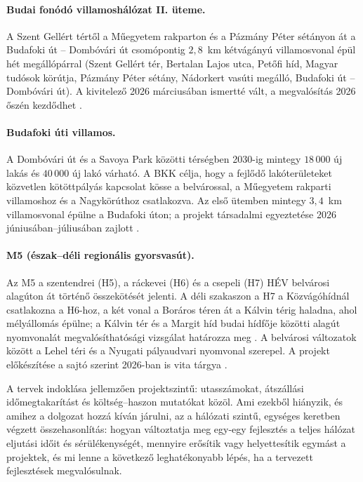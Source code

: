 \documentclass[12pt,a4paper]{article}
\theoremstyle{definition}
\theoremstyle{remark}
\begin{document}
\paragraph{Budai fonódó villamoshálózat II. üteme.}
A Szent Gellért tértől a Műegyetem rakparton és a Pázmány Péter sétányon át
a Budafoki út -- Dombóvári út csomópontig $2{,}8$~km kétvágányú villamosvonal
épül hét megállópárral (Szent Gellért tér, Bertalan Lajos utca, Petőfi híd,
Magyar tudósok körútja, Pázmány Péter sétány, Nádorkert vasúti megálló,
Budafoki út -- Dombóvári út). A kivitelező 2026 márciusában ismertté vált, a
megvalósítás 2026 őszén kezdődhet \citep{bkk2026bf2, beruhazas2026}.

\paragraph{Budafoki úti villamos.}
A Dombóvári út és a Savoya Park közötti térségben 2030-ig mintegy $18\,000$ új
lakás és $40\,000$ új lakó várható. A BKK célja, hogy a fejlődő
lakóterületeket közvetlen kötöttpályás kapcsolat kösse a belvárossal, a
Műegyetem rakparti villamoshoz és a Nagykörúthoz csatlakozva. Az első
ütemben mintegy $3{,}4$~km villamosvonal épülne a Budafoki úton; a projekt
társadalmi egyeztetése 2026 júniusában--júliusában zajlott
\citep{bkk2026budafoki}.

\paragraph{M5 (észak--déli regionális gyorsvasút).}
Az M5 a szentendrei (H5), a ráckevei (H6) és a csepeli (H7) HÉV belvárosi
alagúton át történő összekötését jelenti. A déli szakaszon a H7 a
Közvágóhídnál csatlakozna a H6-hoz, a két vonal a Boráros téren át a Kálvin
térig haladna, ahol mélyállomás épülne; a Kálvin tér és a Margit híd budai
hídfője közötti alagút nyomvonalát megvalósíthatósági vizsgálat határozza meg
\citep{bavs2021, metropol2022}. A belvárosi változatok között a Lehel téri
és a Nyugati pályaudvari nyomvonal szerepel. A projekt előkészítése a
sajtó szerint 2026-ban is vita tárgya \citep{economx2026}.

A tervek indoklása jellemzően projektszintű: utasszámokat, átszállási
időmegtakarítást és költség--haszon mutatókat közöl. Ami ezekből hiányzik, és
amihez a dolgozat hozzá kíván járulni, az a hálózati szintű, egységes keretben
végzett összehasonlítás: hogyan változtatja meg egy-egy fejlesztés a teljes
hálózat eljutási időit és sérülékenységét, mennyire erősítik vagy helyettesítik
egymást a projektek, és mi lenne a következő leghatékonyabb lépés, ha a
tervezett fejlesztések megvalósulnak.
\end{document}
